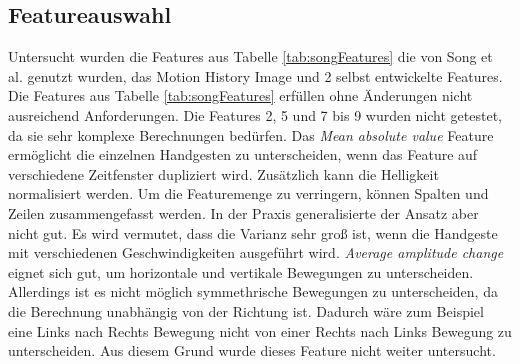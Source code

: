 \subsection{Featureauswahl}
\label{sec:feature_selection}
Untersucht wurden die Features aus Tabelle \ref{tab:songFeatures} die von Song et al. genutzt wurden, das Motion History Image und 2 selbst entwickelte Features. Die Features aus
Tabelle \ref{tab:songFeatures} erfüllen ohne Änderungen nicht ausreichend Anforderungen. Die Features 2, 5 und 7 bis 9 wurden nicht getestet, da sie sehr komplexe Berechnungen bedürfen.
\newline
\newline
Das \textit{Mean absolute value} Feature ermöglicht die einzelnen Handgesten zu unterscheiden, wenn das Feature auf verschiedene Zeitfenster dupliziert wird. Zusätzlich kann die Helligkeit normalisiert werden.
Um die Featuremenge zu verringern, können Spalten und Zeilen zusammengefasst werden. In der Praxis generalisierte der Ansatz aber nicht gut. Es wird vermutet, dass die Varianz sehr groß ist, wenn die
Handgeste mit verschiedenen Geschwindigkeiten ausgeführt wird.
\newline
\newline
\textit{Average amplitude change} eignet sich gut, um horizontale und vertikale Bewegungen zu unterscheiden. Allerdings ist es nicht möglich symmethrische Bewegungen zu unterscheiden, da die Berechnung
unabhängig von der Richtung ist. Dadurch wäre zum Beispiel eine Links nach Rechts Bewegung nicht von einer Rechts nach Links Bewegung zu unterscheiden. Aus diesem Grund wurde dieses Feature nicht
weiter untersucht.

